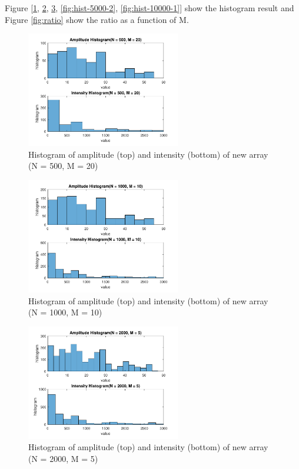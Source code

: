 \documentclass{article}
\begin{document}
Figure [\ref{fig:hist-500-20},   \ref{fig:hist-1000-10},  \ref{fig:hist-2000-5}, \ref{fig:hist-5000-2}, \ref{fig:hist-10000-1}] 
show the histogram result and Figure \ref{fig:ratio} show the ratio as a function of M.

\begin{figure}[H]
	\centering
	\includegraphics[width = 0.6\textwidth]{src/2pi/hist_500_20.pdf}
	\caption{Histogram of amplitude (top) and intensity (bottom) of new array (N = 500, M = 20)}
	\label{fig:hist-500-20}
\end{figure}
\begin{figure}[H]
	\centering
	\includegraphics[width = 0.6\textwidth]{src/2pi/hist_1000_10.pdf}
	\caption{Histogram of amplitude (top) and intensity (bottom) of new array (N = 1000, M = 10)}
	\label{fig:hist-1000-10}
\end{figure}
\begin{figure}[H]
	\centering
	\includegraphics[width = 0.6\textwidth]{src/2pi/hist_2000_5.pdf}
	\caption{Histogram of amplitude (top) and intensity (bottom) of new array (N = 2000, M = 5)}
	\label{fig:hist-2000-5}
\end{figure}
\end{document}
